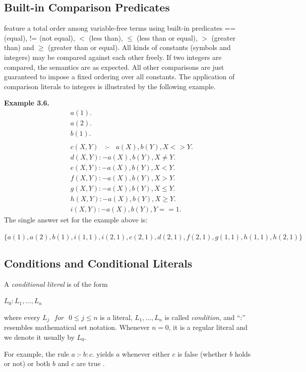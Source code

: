 \documentclass[14pt,a4paper, titlepage]{article}
\DeclareMathOperator{\leftimpl}{:-}
\begin{document}
\subsection{Built-in Comparison Predicates}
\dlvhex{} feature a total order among variable-free terms using built-in predicates == (equal), != (not equal), $<$ (less than), $\leq$ (less than or equal), $>$ (greater than) and $\geq$ (greater than or equal). All kinds of constants (symbols and integers) may be compared against each other freely. If two integers are compared, the semantics are as expected. All other comparisons are just guaranteed to impose a fixed ordering over all constants. The application of comparison literals to integers is illustrated by the following example.

\textbf{Example 3.6.}
\begin{align*}
& a(1). \\
& a(2). \\
& b(1). \\
& \\
& c(X,Y) \text{ } \leftimpl \text{ } a(X), b(Y), X <> Y. \\
& d(X,Y) :- a(X), b(Y), X \neq Y. \\
& e(X,Y) :- a(X), b(Y), X < Y. \\
& f(X,Y) :- a(X), b(Y), X > Y. \\
& g(X,Y) :- a(X), b(Y), X \leq Y. \\
& h(X,Y) :- a(X), b(Y), X \geq Y. \\
& i(X,Y) :- a(X), b(Y), Y == 1. 
\end{align*}
The single answer set for the example above is:\\ \centerline{ $\mathit{\{a(1),a(2),b(1),i(1,1),i(2,1),c(2,1),d(2,1),f(2,1),g(1,1),h(1,1),h(2,1)\}}
$}

\subsection{Conditions and Conditional Literals}
A \emph{conditional literal} is of the form \\ \centerline{$L_0:L_1,\dots,L_n$} where every $\mathit{L_j \text{ } for \text{ } 0 \leq j \leq n}$ is a literal, $L_1,\dots,L_n$ is called \emph{condition}, and \enquote{:} resembles mathematical set notation. Whenever $\mathit{n = 0}$, it is a regular literal and we denote it usually by $L_0$.

For example, the rule $\mathit{a \leftimpl b : c.}$ yields $a$ whenever either $c$ is false (whether $b$ holds or not) or both $b$ and $c$ are true \cite{pott}.
\end{document}
